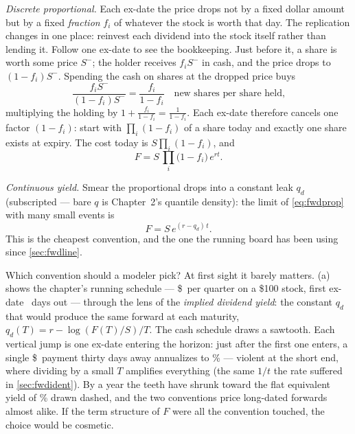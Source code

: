 \emph{Discrete proportional.}  Each ex-date the price drops not by a
fixed dollar amount but by a fixed \emph{fraction} $f_i$ of whatever
the stock is worth that day.  The replication changes in one place:
reinvest each dividend into the stock itself rather than lending it.
Follow one ex-date to see the bookkeeping.  Just before it, a share
is worth some price $S^-$; the holder receives $f_iS^-$ in cash, and
the price drops to $(1-f_i)S^-$.  Spending the cash on shares at the
dropped price buys
\[
\frac{f_iS^-}{(1-f_i)S^-}=\frac{f_i}{1-f_i}
\quad\text{new shares per share held,}
\]
multiplying the holding by
$1+\tfrac{f_i}{1-f_i}=\tfrac{1}{1-f_i}$.  Each ex-date therefore
cancels one factor $(1-f_i)$: start with $\prod_i(1-f_i)$ of a share
today and exactly one share exists at expiry.  The cost today is
$S\prod_i(1-f_i)$, and
\begin{equation}
F=S\,\prod_i\big(1-f_i\big)\,e^{rt}.
\label{eq:fwdprop}
\end{equation}

\emph{Continuous yield.}  Smear the proportional drops into a
constant leak $q_d$ (subscripted --- bare $q$ is Chapter~2's quantile
density): the limit of \eqref{eq:fwdprop} with many small events is
\begin{equation}
F=S\,e^{(r-q_d)\,t}.
\label{eq:fwdyield}
\end{equation}
This is the cheapest convention, and the one the running board has
been using since \cref{sec:fwdline}.

Which convention should a modeler pick?  At first sight it barely
matters.  (a) shows the chapter's running schedule
--- \$\MacFwdDivCashDollars\ per quarter on a \$100 stock, first
ex-date \MacFwdDivFirstDays\ days out --- through the lens of the
\emph{implied dividend yield}: the constant $q_d$ that would produce
the same forward at each maturity, $q_d(T)=r-\log(F(T)/S)/T$.  The
cash schedule draws a sawtooth.  Each vertical jump is one ex-date
entering the horizon: just after the first one enters, a single
\$\MacFwdDivCashDollars\ payment thirty days away annualizes to
\MacFwdDivToothPct\% --- violent at the short end, where dividing by a
small $T$ amplifies everything (the same $1/t$ the rate suffered in
\cref{sec:fwdident}).  By a year the teeth have shrunk toward the flat
equivalent yield of \MacFwdDivQeqPct\% drawn dashed, and the two
conventions price long-dated forwards almost alike.  If the term
structure of $F$ were all the convention touched, the choice would be
cosmetic.

